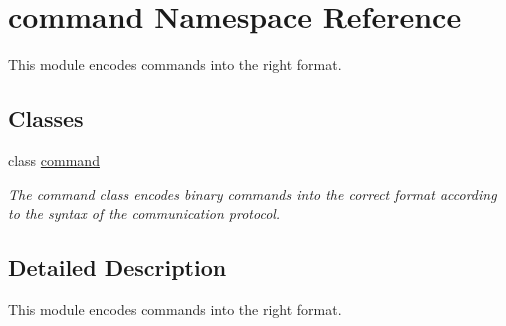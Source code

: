 \hypertarget{namespacecommand}{}\section{command Namespace Reference}
\label{namespacecommand}


This module encodes commands into the right format.  


\subsection*{Classes}
\begin{DoxyCompactItemize}
\item 
class \hyperlink{classcommand_1_1command}{command}
\begin{DoxyCompactList}\small\item\em The command class encodes binary commands into the correct format according to the syntax of the communication protocol. \end{DoxyCompactList}\end{DoxyCompactItemize}


\subsection{Detailed Description}
This module encodes commands into the right format. 